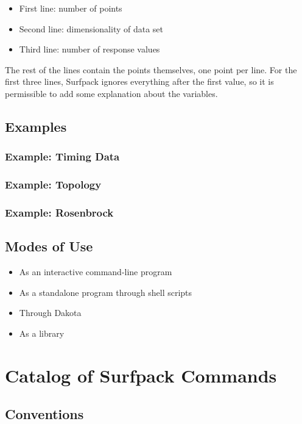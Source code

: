 \documentclass{article}
\begin{document}
\begin{itemize}
\item First line: number of points
\item Second line: dimensionality of data set
\item Third line: number of response values
\end{itemize}

The rest of the lines contain the points themselves, one point per
line.  For the first three lines, Surfpack ignores everything after
the first value, so it is permissible to add some explanation about
the variables.



\subsection{\textup{Examples}}\label{sec:example}


\subsubsection{Example: Timing Data}
\subsubsection{Example: Topology }
\subsubsection{Example: Rosenbrock}

\subsection{Modes of Use}
\begin{itemize}
\item As an interactive command-line program
\item As a standalone program through shell scripts
\item Through Dakota
\item As a library
\end{itemize}

\section{Catalog of Surfpack Commands}\label{sec:commands}
\subsection{Conventions}
\end{document}

